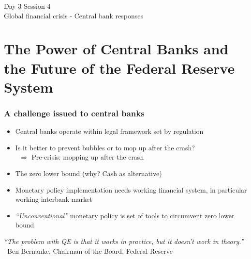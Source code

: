 \documentclass[11pt]{beamer}
\begin{document}
\begin{frame}
\begin{center}
 Day 3 Session 4 \\
Global financial crisis - Central bank responses
\end{center}
\end{frame}
\section{The Power of Central Banks and the Future of the Federal Reserve System}\label{Sec::Chapter2}
%




\begin{frame}
	\frametitle{A challenge issued to central banks}
	\begin{itemize}\itemsep10pt
    	\item Central banks operate within legal framework set by regulation
        \item Is it better to prevent bubbles or to mop up after the crash?\\
	        ~\hfill $\Rightarrow$ Pre-crisis: mopping up after the crash
        \item The zero lower bound (why? Cash as alternative)
        \item Monetary policy implementation needs working financial system, in particular working interbank market
        \item \textit{``Unconventional''} monetary policy is set of tools to circumvent zero lower bound
        ~\\
    \end{itemize}
    \textit{``The problem with QE is that it works in practice, but it doesn’t work in theory.''}\\
    ~\hfill Ben Bernanke, Chairman of the Board, Federal Reserve
\end{frame}

\end{document}
